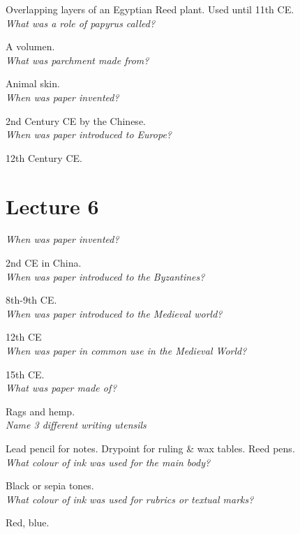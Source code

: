 \documentclass[12pt]{article}
\begin{document}
Overlapping layers of an Egyptian Reed plant. Used until 11th CE. \\

\textit{What was a role of papyrus called?}

A volumen.\\

\textit{What was parchment made from?}

Animal skin.\\

\textit{When was paper invented?}

2nd Century CE by the Chinese.\\

\textit{When was paper introduced to Europe?}

12th Century CE.\\

\section*{Lecture 6}

\textit{When was paper invented?}

2nd CE in China.\\

\textit{When was paper introduced to the Byzantines?}

8th-9th CE.\\

\textit{When was paper introduced to the Medieval world?}

12th CE\\

\textit{When was paper in common use in the Medieval World?}

15th CE.\\

\textit{What was paper made of?}

Rags and hemp.\\

\textit{Name 3 different writing utensils}

Lead pencil for notes. Drypoint for ruling \& wax tables. Reed pens.\\

\textit{What colour of ink was used for the main body?}

Black or sepia tones.\\

\textit{What colour of ink was used for rubrics or textual marks?}

Red, blue.\\
\end{document}
